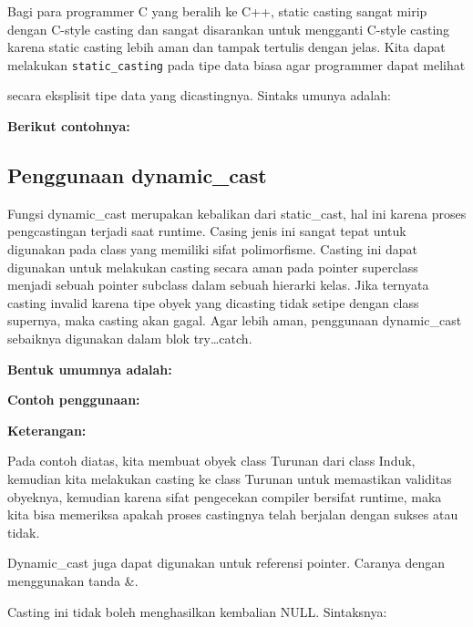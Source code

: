 Bagi para programmer C yang beralih ke C++, static casting sangat mirip
dengan C-style casting dan sangat disarankan untuk mengganti C-style
casting karena static casting lebih aman dan tampak tertulis dengan
jelas. Kita dapat melakukan \texttt{static\_casting} pada tipe data
biasa agar programmer dapat melihat

secara eksplisit tipe data yang dicastingnya. Sintaks umunya adalah:



\textbf{Berikut contohnya:}



\subsection{Penggunaan dynamic\_cast}\label{penggunaan-dynamicux5fcast}

Fungsi dynamic\_cast merupakan kebalikan dari static\_cast, hal ini
karena proses pengcastingan terjadi saat runtime. Casing jenis ini
sangat tepat untuk digunakan pada class yang memiliki sifat
polimorfisme. Casting ini dapat digunakan untuk melakukan casting secara
aman pada pointer superclass menjadi sebuah pointer subclass dalam
sebuah hierarki kelas. Jika ternyata casting invalid karena tipe obyek
yang dicasting tidak setipe dengan class supernya, maka casting akan
gagal. Agar lebih aman, penggunaan dynamic\_cast sebaiknya digunakan
dalam blok try\ldots{}catch.

\textbf{Bentuk umumnya adalah:}



\textbf{Contoh penggunaan:}



\textbf{Keterangan:}

Pada contoh diatas, kita membuat obyek class Turunan dari class Induk,
kemudian kita melakukan casting ke class Turunan untuk memastikan
validitas obyeknya, kemudian karena sifat pengecekan compiler bersifat
runtime, maka kita bisa memeriksa apakah proses castingnya telah
berjalan dengan sukses atau tidak.

Dynamic\_cast juga dapat digunakan untuk referensi pointer. Caranya
dengan menggunakan tanda \&.

Casting ini tidak boleh menghasilkan kembalian NULL. Sintaksnya:

